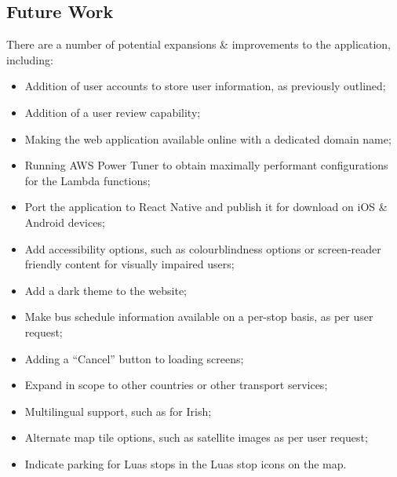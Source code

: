 \documentclass[a4paper,11pt]{report}
\begin{document}
\subsection{Future Work}
There are a number of potential expansions \& improvements to the application, including:
\begin{itemize}
    \item   Addition of user accounts to store user information, as previously outlined;
    \item   Addition of a user review capability;
    \item   Making the web application available online with a dedicated domain name;
    \item   Running AWS Power Tuner to obtain maximally performant configurations for the Lambda functions;
    \item   Port the application to React Native and publish it for download on iOS \& Android devices;
    \item   Add accessibility options, such as colourblindness options or screen-reader friendly content for visually impaired users;
    \item   Add a dark theme to the website;
    \item   Make bus schedule information available on a per-stop basis, as per user request;
    \item   Adding a ``Cancel'' button to loading screens;
    \item   Expand in scope to other countries or other transport services;
    \item   Multilingual support, such as for Irish;
    \item   Alternate map tile options, such as satellite images as per user request;
    \item   Indicate parking for Luas stops in the Luas stop icons on the map.
\end{itemize}
\end{document}
